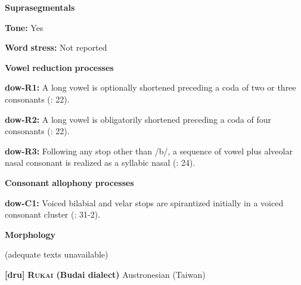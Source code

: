 \begin{styleBody}
\textbf{Suprasegmentals}
\end{styleBody}

\begin{styleBody}
\textbf{Tone:} Yes
\end{styleBody}

\begin{styleBody}
\textbf{Word} \textbf{stress:} Not reported
\end{styleBody}

\begin{styleBody}
\textbf{Vowel} \textbf{reduction} \textbf{processes}
\end{styleBody}

\begin{styleBody}
\textbf{dow-R1:} A long vowel is optionally shortened preceding a coda of two or three consonants (\citealt{WieringWiering1994}: 22).
\end{styleBody}

\begin{styleBody}
\textbf{dow-R2:} A long vowel is obligatorily shortened preceding a coda of four consonants (\citealt{WieringWiering1994}: 22).
\end{styleBody}

\begin{styleBody}
\textbf{dow-R3:} Following any stop other than /b/, a sequence of vowel plus alveolar nasal consonant is realized as a syllabic nasal (\citealt{WieringWiering1994}: 24).
\end{styleBody}

\begin{styleBody}
\textbf{Consonant} \textbf{allophony} \textbf{processes}
\end{styleBody}

\begin{styleBody}
\textbf{dow-C1:} Voiced bilabial and velar stops are spirantized initially in a voiced consonant cluster (\citealt{WieringWiering1994}: 31-2).
\end{styleBody}

\begin{styleBody}
\textbf{Morphology}
\end{styleBody}

\begin{styleBody}
(adequate texts unavailable)
\end{styleBody}

\begin{styleBody}
\textbf{[dru]}   \textbf{\textsc{Rukai} \textbf{(Budai} \textbf{dialect)}  }Austronesian (Taiwan)
\end{styleBody}

